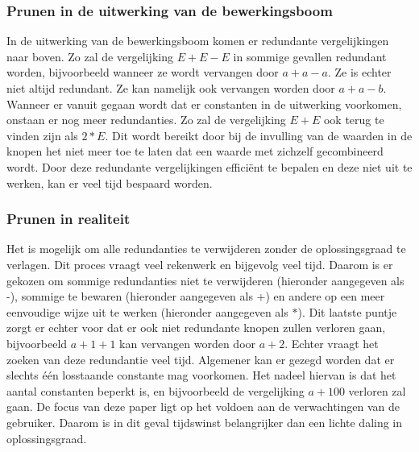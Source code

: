 \documentclass[Main.tex]{subfiles}
\begin{document}
\subsubsection*{Prunen in de uitwerking van de bewerkingsboom}
In de uitwerking van de bewerkingsboom komen er redundante vergelijkingen naar boven. Zo zal de vergelijking $E+E-E$ in sommige gevallen redundant worden, bijvoorbeeld wanneer ze wordt vervangen door $a+a-a$. Ze is echter niet altijd redundant. Ze kan namelijk ook vervangen worden door $a+a-b$. Wanneer er vanuit gegaan wordt dat er constanten in de uitwerking voorkomen, onstaan er nog meer redundanties. Zo zal de vergelijking $E+E$ ook terug te vinden zijn als $2*E$. Dit wordt bereikt door bij de invulling van de waarden in de knopen het niet meer toe te laten dat een waarde met zichzelf gecombineerd wordt. Door deze redundante vergelijkingen effici\"ent te bepalen en deze niet uit te werken, kan er veel tijd bespaard worden.

\subsubsection*{Prunen in realiteit}
Het is mogelijk om alle redundanties te verwijderen zonder de oplossingsgraad te verlagen. Dit proces vraagt veel rekenwerk en bijgevolg veel tijd. Daarom is er gekozen om sommige redundanties niet te verwijderen (hieronder aangegeven als -), sommige te bewaren (hieronder aangegeven als +) en andere op  een meer eenvoudige wijze uit te werken (hieronder aangegeven als $\ast$). Dit laatste puntje zorgt er echter voor dat er ook niet redundante knopen zullen verloren gaan, bijvoorbeeld $a+1+1$ kan vervangen worden door $a+2$. Echter vraagt het zoeken van deze redundantie veel tijd. Algemener kan er gezegd worden dat er slechts \'e\'en losstaande constante mag voorkomen. Het nadeel hiervan is dat het aantal constanten beperkt is, en bijvoorbeeld de vergelijking $a+100$ verloren zal gaan. De focus van deze paper ligt op het voldoen aan de verwachtingen van de gebruiker. Daarom is in dit geval tijdswinst belangrijker dan een lichte daling in oplossingsgraad. 
\end{document}
